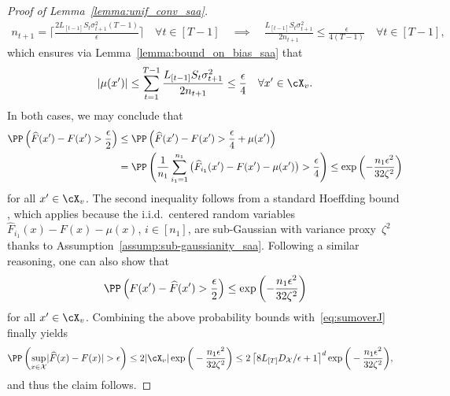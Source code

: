 \documentclass[11pt]{article}
\let\hat\widehat
\begin{document}
\begin{proof}[Proof of Lemma~\ref{lemma:unif_conv_saa}]
\begin{align*}
    n_{t+1}=\bigg\lceil \frac{2L_{[t-1]}S_t\sigma_{t+1}^2 (T-1)}{\epsilon} \bigg\rceil \quad \forall t\in[T-1] \quad \implies \quad \frac{L_{[t-1]}S_t\sigma_{t+1}^2}{ 2 n_{t+1}} \leq \frac{\epsilon}{4(T-1)} \quad \forall t\in[T-1],
\end{align*}
which ensures via Lemma~\ref{lemma:bound_on_bias_saa} that
\begin{align*}
    \left| \mu(x^\prime) \right|\leq \sum_{t=1}^{T-1} \frac{L_{[t-1]}S_t\sigma_{t+1}^2}{2n_{t+1}} \leq \frac{\epsilon}{4} \quad \forall x'\in\cX_v.
\end{align*}
In both cases, we may conclude that 
\begin{align*}
    \PP\left( \hat{F}(x^\prime) - F(x^\prime) > \frac{\epsilon}{2}\right) 
    &\leq \PP\left( \hat{F}(x^\prime) - F(x^\prime)  > \frac{\epsilon}{4} + \mu(x^\prime) \right)  \\
    &= \PP \left( \frac{1}{n_1}\sum_{i_1=1}^{n_1}\big(\hat F_{i_1}(x^\prime)-F(x^\prime)-\mu(x^\prime) \big) > \frac{\epsilon}{4} \right) \leq \exp\left(- \frac{n_1\epsilon^2}{32 \zeta^2} \right)
\end{align*}
for all $x'\in\cX_v$. The second inequality follows from a standard Hoeffding bound \cite[Proposition~2.5]{wainwright2019high}, which applies because the i.i.d.\ centered random variables $\hat F_{i_1}(x)-F(x)-\mu(x)$, $i\in[n_1]$, are sub-Gaussian with variance proxy~$\zeta^2$ thanks to Assumption~\ref{assump:sub-gaussianity_saa}. Following a similar reasoning, one can also show that 
\begin{align*}
    \PP\left( F(x^\prime)- \hat{F}(x^\prime)  > \frac{\epsilon}{2}\right) \leq \exp\left(- \frac{n_1\epsilon^2}{32\zeta^2} \right)
\end{align*}
for all $x'\in\cX_v$. Combining the above probability bounds with~\eqref{eq:sumoverJ} finally yields
\begin{align*}
    \PP\left(\sup_{x\in \mathcal{X}} \lvert \hat{F}(x) - F(x) \rvert > \epsilon \right) 
    &\leq 2|\cX_v| \exp\bigg(- \frac{n_1\epsilon^2}{32 \zeta^2} \bigg) \leq 2\left\lceil 8L_{[T]} D_\mathcal{X}/\epsilon + 1 \right\rceil^{d} \exp\bigg(- \frac{n_1\epsilon^2}{32\zeta^2} \bigg),
\end{align*}
and thus the claim follows.
\end{proof}
\end{document}
